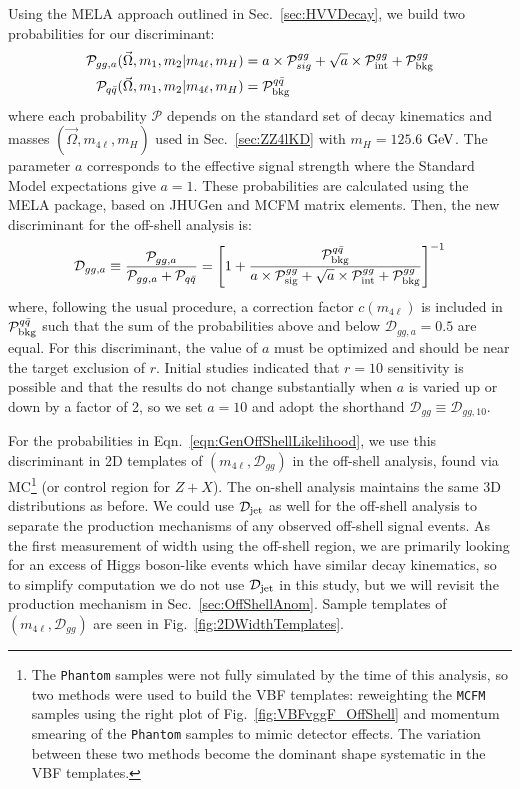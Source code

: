 Using the MELA approach outlined in Sec.~\ref{sec:HVVDecay}, we build two probabilities for our discriminant:
\begin{align}
\mathcal{P}_{gg,a}(\vec{\Omega},m_1,m_2|m_{4\ell},m_{H}) &= a\times\mathcal{P}_{sig}^{gg} + \sqrt{a}\times\mathcal{P}_{\rm int}^{gg} + \mathcal{P}_{\rm bkg}^{gg} \\
\mathcal{P}_{q\bar{q}}(\vec{\Omega},m_1,m_2|m_{4\ell},m_{H}) &= \mathcal{P}_{\rm bkg}^{q\bar{q}}
\end{align}
where each probability $\mathcal{P}$ depends on the standard set of decay kinematics and masses $(\vec{\Omega},m_{4\ell},m_H)$ used in Sec.~\ref{sec:ZZ4lKD} with $m_H=125.6$ $\rm{GeV}$. The parameter $a$ corresponds to the effective signal strength where the Standard Model expectations give $a=1$. These probabilities are calculated using the MELA package, based on JHUGen and MCFM matrix elements. Then, the new discriminant for the off-shell analysis is:
\begin{equation}
\mathcal{D}_{gg,a} \equiv \frac{\mathcal{P}_{gg,a}}{\mathcal{P}_{gg,a}+\mathcal{P}_{q\bar{q}}} = \left[1 + \frac{\mathcal{P}_{\rm bkg}^{q\bar{q}}}{a\times\mathcal{P}_{\rm sig}^{gg} + \sqrt{a}\times\mathcal{P}_{\rm int}^{gg} + \mathcal{P}_{\rm bkg}^{gg}}\right]^{-1}
\end{equation}
where, following the usual procedure, a correction factor $c(m_{4\ell})$ is included in $\mathcal{P}_{\rm bkg}^{q\bar{q}}$ such that the sum of the probabilities above and below $\mathcal{D}_{gg,a}=0.5$ are equal. For this discriminant, the value of $a$ must be optimized and should be near the target exclusion of $r$. Initial studies indicated that $r=10$ sensitivity is possible and that the results do not change substantially when $a$ is varied up or down by a factor of 2, so we set $a=10$ and adopt the shorthand $\mathcal{D}_{gg} \equiv \mathcal{D}_{gg,10}$.

For the probabilities in Eqn.~\ref{eqn:GenOffShellLikelihood}, we use this discriminant in 2D templates of $(m_{4\ell},\mathcal{D}_{gg})$ in the off-shell analysis, found via MC\footnote{The {\tt Phantom} samples were not fully simulated by the time of this analysis, so two methods were used to build the VBF templates: reweighting the {\tt MCFM} samples using the right plot of Fig.~\ref{fig:VBFvggF_OffShell} and momentum smearing of the {\tt Phantom} samples to mimic detector effects. The variation between these two methods become the dominant shape systematic in the VBF templates.} (or control region for $Z+X$). The on-shell analysis maintains the same 3D distributions as before. We could use $\mathcal{D}_{\rm jet}$ as well for the off-shell analysis to separate the production mechanisms of any observed off-shell signal events. As the first measurement of width using the off-shell region, we are primarily looking for an excess of Higgs boson-like events which have similar decay kinematics, so to simplify computation we do not use $\mathcal{D}_{\rm jet}$ in this study, but we will revisit the production mechanism in Sec.~\ref{sec:OffShellAnom}. Sample templates of $(m_{4\ell},\mathcal{D}_{gg})$ are seen in Fig.~\ref{fig:2DWidthTemplates}.

